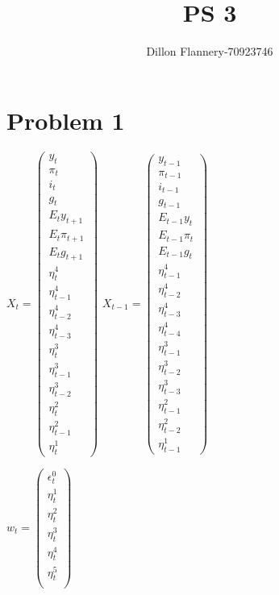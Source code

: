 \documentclass[]{article}
\title{PS 3}
\author{Dillon Flannery-70923746}
\begin{document}
\maketitle
\section*{Problem 1}
$
X_t = \begin{pmatrix}
y_t\\ \pi_t \\ i_t \\ g_t \\ E_ty_{t+1} \\ E_t\pi_{t+1} \\	E_t g_{t+1} \\ \eta_t^4 \\ \eta_{t-1}^4 \\ \eta_{t-2}^4 \\ \eta_{t-3}^4 \\ \eta_{t}^3 \\ \eta_{t-1}^3 \\ \eta_{t-2}^3 \\ \eta_{t}^2 \\ \eta_{t-1}^2 \\ \eta_t^1
\end{pmatrix}
$
$
X_{t-1} = \begin{pmatrix}
y_{t-1}\\ \pi_{t-1}\\ i_{t-1} \\ g_{t-1} \\ E_{t-1}y_{t} \\ E_{t-1}\pi_{t} \\E_{t-1} g_t \\	\eta_{t-1}^4 \\ \eta_{t-2}^4 \\ \eta_{t-3}^4 \\ \eta_{t-4}^4 \\ \eta_{t-1}^3 \\ \eta_{t-2}^3 \\ \eta_{t-3}^3 \\ \eta_{t-1}^2 \\ \eta_{t-2}^2 \\ \eta_{t-1}^1
\end{pmatrix}
$ 

$ w_t  = 
\begin{pmatrix}
\epsilon_t^0	\\
\eta_t^1 \\
\eta_t^2\\
\eta_t^3\\
\eta_t^4 \\
\eta_t^5 \\
\end{pmatrix}
$ \\
\end{document}
